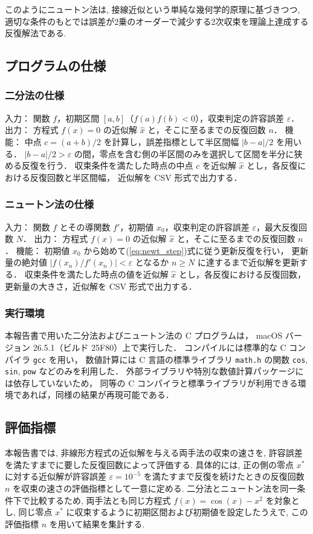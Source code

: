 \documentclass[a4paper,fontsize=11pt,line_length=40zw,number_of_lines=35,baselineskip=1.7zw]{jlreq}
\begin{document}
このようにニュートン法は, 接線近似という単純な幾何学的原理に基づきつつ, 
適切な条件のもとでは誤差が2乗のオーダーで減少する2次収束を理論上達成する反復解法である. 

\subsection{プログラムの仕様}
\subsubsection{二分法の仕様}
入力： 関数 $f$，初期区間 $[a,b]$（$f(a)f(b)<0$），収束判定の許容誤差 $\varepsilon$．
出力： 方程式 $f(x)=0$ の近似解 $\hat{x}$ と，そこに至るまでの反復回数 $n$．
機能： 中点 $c=(a+b)/2$ を計算し，誤差指標として半区間幅 $|b-a|/2$ を用いる．
  $|b-a|/2>\varepsilon$ の間，零点を含む側の半区間のみを選択して区間を半分に狭める反復を行う．
  収束条件を満たした時点の中点 $c$ を近似解 $\hat{x}$ とし，各反復における反復回数と半区間幅，
  近似解を CSV 形式で出力する．

\subsubsection{ニュートン法の仕様}
入力： 関数 $f$ とその導関数 $f'$，初期値 $x_0$，収束判定の許容誤差 $\varepsilon$，最大反復回数 $N$．
出力： 方程式 $f(x)=0$ の近似解 $\hat{x}$ と，そこに至るまでの反復回数 $n$．
機能： 
  初期値 $x_0$ から始めて(\ref{eq:newt_step})式に従う更新反復を行い，
  更新量の絶対値 $|f(x_n)/f'(x_n)|<\varepsilon$ となるか $n\ge N$ に達するまで近似解を更新する．
  収束条件を満たした時点の値を近似解 $\hat{x}$ とし，各反復における反復回数，
  更新量の大きさ，近似解を CSV 形式で出力する．

\subsubsection{実行環境}
本報告書で用いた二分法およびニュートン法の C プログラムは，
macOS バージョン 26.5.1（ビルド 25F80）上で実行した．
コンパイルには標準的な C コンパイラ \texttt{gcc} を用い，
数値計算には C 言語の標準ライブラリ \texttt{math.h} の関数
\texttt{cos}, \texttt{sin}, \texttt{pow} などのみを利用した．
外部ライブラリや特別な数値計算パッケージには依存していないため，
同等の C コンパイラと標準ライブラリが利用できる環境であれば，同様の結果が再現可能である．

\subsection{評価指標}
本報告書では, 非線形方程式の近似解を与える両手法の収束の速さを, 許容誤差を満たすまでに要した反復回数によって評価する. 
具体的には, 正の側の零点 $x^*$ に対する近似解が許容誤差 $\varepsilon = 10^{-5}$ を満たすまで反復を続けたときの反復回数 $n$ を収束の速さの評価指標として一意に定める.
二分法とニュートン法を同一条件下で比較するため, 両手法とも同じ方程式 $f(x)=\cos(x)-x^2$ を対象とし,
同じ零点 $x^*$ に収束するように初期区間および初期値を設定したうえで, この評価指標 $n$ を用いて結果を集計する.
\end{document}
